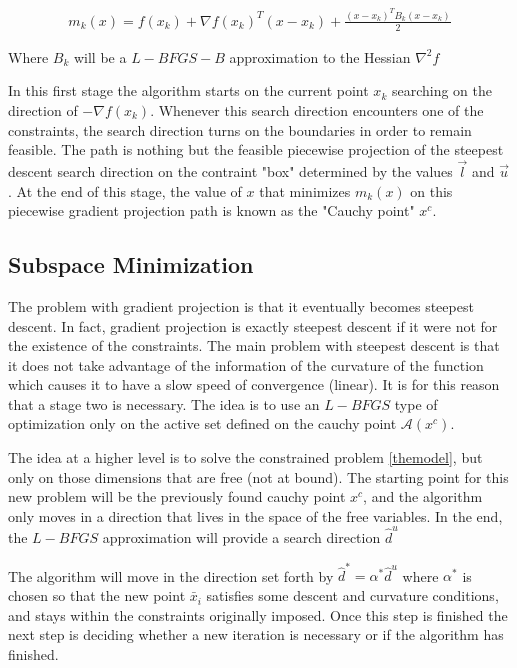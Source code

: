 \begin{equation} \label{themodel}
  \begin{aligned}
    m_k(x) = f(x_k) + \nabla f(x_k)^T ( x - x_k) + \frac{(x - x_k)^T B_k (x - x_k) }{2}
  \end{aligned}
\end{equation}

Where $B_k$ will be a $L-BFGS-B$ approximation to the Hessian $\nabla^2 f$

In this first stage the algorithm starts on the current point $x_k$ searching on the direction of $-\nabla f(x_k)$. Whenever this search direction encounters one of the constraints, the search direction turns on the boundaries in order to remain feasible. The path is nothing but the feasible piecewise projection of the steepest descent search direction on the contraint "box" determined by the values $\overrightarrow{l}$ and $\overrightarrow{u}$. At the end of this stage, the value of $x$ that minimizes $m_k(x)$ on this piecewise gradient projection path is known as the "Cauchy point" $x^c$.

\subsection{Subspace Minimization}

The problem with gradient projection is that it eventually becomes steepest descent. In fact, gradient projection is exactly steepest descent if it were not for the existence of the constraints. The main problem with steepest descent is that it does not take advantage of the information of the curvature of the function which causes it to have a slow speed of convergence (linear). It is for this reason that a stage two is necessary. The idea is to use an $L-BFGS$ type of optimization only on the active set defined on the cauchy point $\mathcal{A}(x^c)$.

The idea at a higher level is to solve the constrained problem \ref{themodel}, but only on those dimensions that are free (not at bound). The starting point for this new problem will be the previously found cauchy point $x^c$, and the algorithm only moves in a direction that lives in the space of the free variables. In the end, the $L-BFGS$ approximation will provide a search direction $\hat{d}^u$

The algorithm will move in the direction set forth by $\hat{d}^* = \alpha^* \hat{d}^u$ where $\alpha^*$ is chosen so that the new point $\bar{x}_i$ satisfies some descent and curvature conditions, and stays within the constraints originally imposed. Once this step is finished the next step is deciding whether a new iteration is necessary or if the algorithm has finished.

